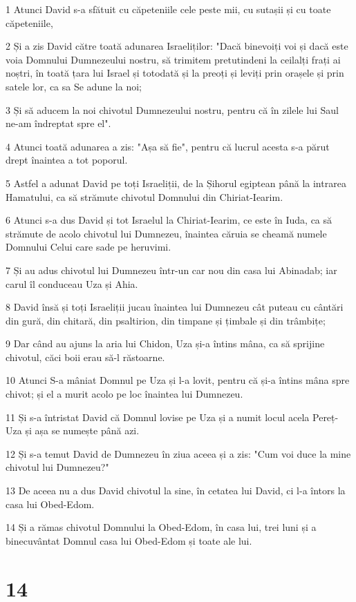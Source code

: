 \par 1 Atunci David s-a sfătuit cu căpeteniile cele peste mii, cu sutașii și cu toate căpeteniile,
\par 2 Și a zis David către toată adunarea Israeliților: "Dacă binevoiți voi și dacă este voia Domnului Dumnezeului nostru, să trimitem pretutindeni la ceilalți frați ai noștri, în toată țara lui Israel și totodată și la preoți și leviți prin orașele și prin satele lor, ca sa Se adune la noi;
\par 3 Și să aducem la noi chivotul Dumnezeului nostru, pentru că în zilele lui Saul ne-am îndreptat spre el".
\par 4 Atunci toată adunarea a zis: "Așa să fie", pentru că lucrul acesta s-a părut drept înaintea a tot poporul.
\par 5 Astfel a adunat David pe toți Israeliții, de la Șihorul egiptean până la intrarea Hamatului, ca să strămute chivotul Domnului din Chiriat-Iearim.
\par 6 Atunci s-a dus David și tot Israelul la Chiriat-Iearim, ce este în Iuda, ca să strămute de acolo chivotul lui Dumnezeu, înaintea căruia se cheamă numele Domnului Celui care sade pe heruvimi.
\par 7 Și au adus chivotul lui Dumnezeu într-un car nou din casa lui Abinadab; iar carul îl conduceau Uza și Ahia.
\par 8 David însă și toți Israeliții jucau înaintea lui Dumnezeu cât puteau cu cântări din gură, din chitară, din psaltirion, din timpane și țimbale și din trâmbițe;
\par 9 Dar când au ajuns la aria lui Chidon, Uza și-a întins mâna, ca să sprijine chivotul, căci boii erau să-l răstoarne.
\par 10 Atunci S-a mâniat Domnul pe Uza și l-a lovit, pentru că și-a întins mâna spre chivot; și el a murit acolo pe loc înaintea lui Dumnezeu.
\par 11 Și s-a întristat David că Domnul lovise pe Uza și a numit locul acela Pereț-Uza și așa se numește până azi.
\par 12 Și s-a temut David de Dumnezeu în ziua aceea și a zis: "Cum voi duce la mine chivotul lui Dumnezeu?"
\par 13 De aceea nu a dus David chivotul la sine, în cetatea lui David, ci l-a întors la casa lui Obed-Edom.
\par 14 Și a rămas chivotul Domnului la Obed-Edom, în casa lui, trei luni și a binecuvântat Domnul casa lui Obed-Edom și toate ale lui.

\chapter{14}

